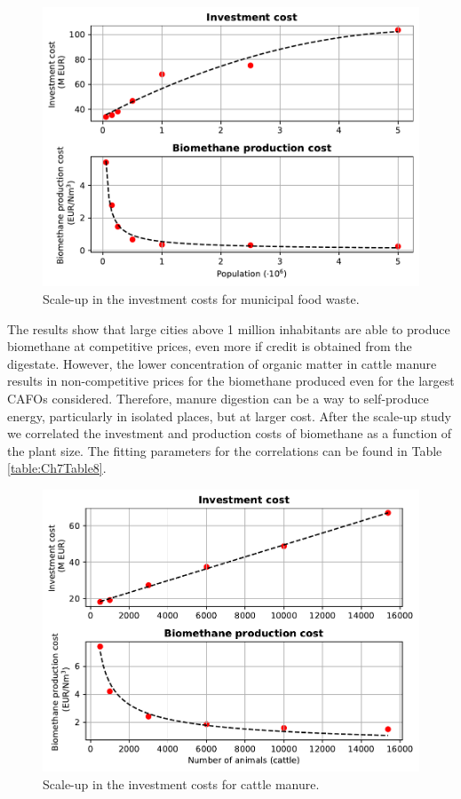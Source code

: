 \begin{refsection}[referencesCh7]
\begin{figure}[h!]
	\centering
	\includegraphics[width=0.8\linewidth, trim={0cm 0cm 0cm 0cm},clip]{gfx/Chapter7/Figure5.pdf} 
	\caption{Scale-up in the investment costs for municipal food waste.}
	\label{fig:Ch7Fig5}
\end{figure}


The results show that large cities above 1 million inhabitants are able to produce biomethane at competitive prices, even more if credit is obtained from the digestate. However, the lower concentration of organic matter in cattle manure results in non-competitive prices for the biomethane produced even for the largest CAFOs considered. Therefore, manure digestion can be a way to self-produce energy, particularly in isolated places, but at larger cost. After the scale-up study we correlated the investment and production costs of biomethane as a function of the plant size. The fitting parameters for the correlations can be found in Table \ref{table:Ch7Table8}.

\begin{figure}[h!]
	\centering
	\includegraphics[width=0.8\linewidth, trim={0cm 0cm 0cm 0cm},clip]{gfx/Chapter7/Figure6.pdf} 
	\caption{Scale-up in the investment costs for cattle manure.}
	\label{fig:Ch7Fig6}
\end{figure}


\end{refsection}
